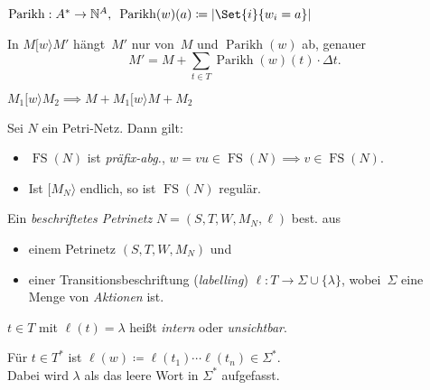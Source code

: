 \documentclass{cheat-sheet}
\newcommand{\activeTransition}[1]{[{#1}\rangle} %
\DeclareMathOperator{\FS}{FS} %
\DeclareMathOperator{\Parikh}{Parikh} %
\begin{document}
\begin{defn}
  $\Parikh : A^{*} \to \N^A, \enspace \Parikh(w)(a) \coloneqq \card{\Set{i}{w_i = a}}$
\end{defn}

\begin{lem}
  In $M \activeTransition{w} M'$ hängt~$M'$ nur von~$M$ und $\Parikh(w)$ ab, genauer
  \[
    M' = M + {\sum}_{t \in T} \Parikh(w)(t) \cdot \Delta t.
  \]
\end{lem}

\begin{lem}
  $M_1 \activeTransition{w} M_2 \implies M + M_1 \activeTransition{w} M + M_2$
\end{lem}


\begin{lem}
  Sei $N$ ein Petri-Netz.
  Dann gilt:
  \begin{itemize}
    \item $\FS(N)$ ist \textit{präfix-abg.}, \dh{} $w = v u \in \FS(N) \implies v \in \FS(N)$.
    \item Ist $\activeTransition{M_N}$ endlich, so ist $\FS(N)$ regulär.
  \end{itemize}
\end{lem}

\begin{defn}
  Ein \emph{beschriftetes Petrinetz} $N = (S, T, W, M_N, \ell)$ best. aus
  \begin{itemize}
    \item einem Petrinetz $(S, T, W, M_N)$ und
    \item einer Transitionsbeschriftung (\textit{labelling}) $\ell : T \to \Sigma \cup \{ \lambda \}$, wobei~$\Sigma$ eine Menge von \textit{Aktionen} ist.
  \end{itemize}
\end{defn}

\begin{sprechweise}
  $t \in T$ mit $\ell(t) = \lambda$ heißt \textit{intern} oder \textit{unsichtbar}.
\end{sprechweise}

\begin{nota}
  \begin{minipage}[t]{0.8 \linewidth}
    Für $t \in T^{*}$ ist $\ell(w) \coloneqq \ell(t_1) \cdots \ell(t_n) \in \Sigma^{*}$. \\
    Dabei wird $\lambda$ als das leere Wort in $\Sigma^{*}$ aufgefasst.
  \end{minipage}
\end{nota}
\end{document}

